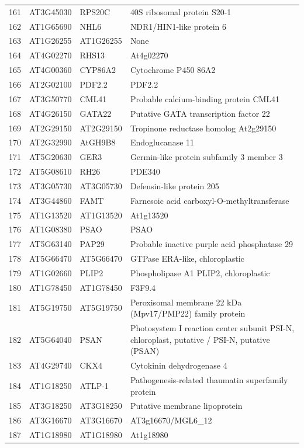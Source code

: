 \documentclass[11pt]{article}
\begin{document}
\begin{center}
\begin{tabular}{rlll}
161 & AT3G45030 & RPS20C & 40S ribosomal protein S20-1\\
162 & AT1G65690 & NHL6 & NDR1/HIN1-like protein 6\\
163 & AT1G26255 & AT1G26255 & None\\
164 & AT4G02270 & RHS13 & At4g02270\\
165 & AT4G00360 & CYP86A2 & Cytochrome P450 86A2\\
166 & AT2G02100 & PDF2.2 & PDF2.2\\
167 & AT3G50770 & CML41 & Probable calcium-binding protein CML41\\
168 & AT4G26150 & GATA22 & Putative GATA transcription factor 22\\
169 & AT2G29150 & AT2G29150 & Tropinone reductase homolog At2g29150\\
170 & AT2G32990 & AtGH9B8 & Endoglucanase 11\\
171 & AT5G20630 & GER3 & Germin-like protein subfamily 3 member 3\\
172 & AT5G08610 & RH26 & PDE340\\
173 & AT3G05730 & AT3G05730 & Defensin-like protein 205\\
174 & AT3G44860 & FAMT & Farnesoic acid carboxyl-O-methyltransferase\\
175 & AT1G13520 & AT1G13520 & At1g13520\\
176 & AT1G08380 & PSAO & PSAO\\
177 & AT5G63140 & PAP29 & Probable inactive purple acid phosphatase 29\\
178 & AT5G66470 & AT5G66470 & GTPase ERA-like, chloroplastic\\
179 & AT1G02660 & PLIP2 & Phospholipase A1 PLIP2, chloroplastic\\
180 & AT1G78450 & AT1G78450 & F3F9.4\\
181 & AT5G19750 & AT5G19750 & Peroxisomal membrane 22 kDa (Mpv17/PMP22) family protein\\
182 & AT5G64040 & PSAN & Photosystem I reaction center subunit PSI-N, chloroplast, putative / PSI-N, putative (PSAN)\\
183 & AT4G29740 & CKX4 & Cytokinin dehydrogenase 4\\
184 & AT1G18250 & ATLP-1 & Pathogenesis-related thaumatin superfamily protein\\
185 & AT3G18250 & AT3G18250 & Putative membrane lipoprotein\\
186 & AT3G16670 & AT3G16670 & AT3g16670/MGL6\_12\\
187 & AT1G18980 & AT1G18980 & At1g18980\\

\end{tabular}
\end{center}
\end{document}
